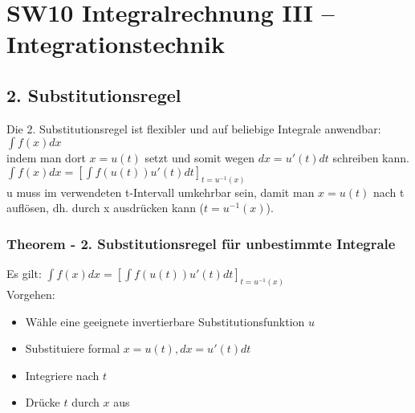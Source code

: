 \documentclass[../main.tex]{subfiles}
\begin{document}
\chapter{SW10 Integralrechnung III -- Integrationstechnik}
\section{2. Substitutionsregel}
Die 2. Substitutionsregel ist flexibler und auf beliebige Integrale anwendbar: \\ [7pt]
$\int f(x)dx$ \\ [7pt]
indem man dort $x = u(t)$ setzt und somit wegen $dx = u'(t)dt$ schreiben kann. \\ [7pt]
$\int f(x)dx = \left[ \int f(u(t))u'(t)dt \right]_{t=u^{-1}(x)}$ \\ [7pt]
u muss im verwendeten t-Intervall umkehrbar sein, damit man $x=u(t)$ nach t auflösen, dh. durch x ausdrücken kann ($t=u^{-1}(x)$).

\subsection{Theorem - 2. Substitutionsregel für unbestimmte Integrale}
Es gilt: $\int f(x)dx = \left[ \int f(u(t))u'(t)dt \right]_{t=u^{-1}(x)}$ \\ [7pt]
Vorgehen: \\
\begin{itemize}
    \item Wähle eine geeignete invertierbare Substitutionsfunktion $u$
    \item Substituiere formal $x = u(t), dx = u'(t)dt$
    \item Integriere nach $t$
    \item Drücke $t$ durch $x$ aus
\end{itemize}
\end{document}
